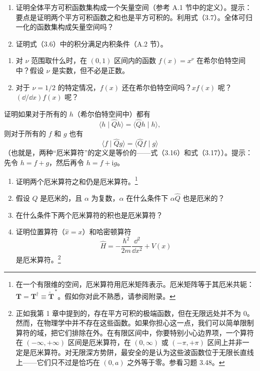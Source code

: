 
\begin{enumerate}
\item 证明全体平方可积函数集构成一个矢量空间（参考 A.1 节中的定义）。提示：要点是证明两个平方可积函数之和也是平方可积的。利用式（3.7）。全体可归一化的函数集构成矢量空间吗？
\item 证明式（3.6）中的积分满足内积条件（A.2 节）。
\end{enumerate}
\vfill

\begin{enumerate}
\item 对 $\nu$ 范围取什么时，在 $(0,1)$ 区间内的函数 $f(x)=x^\nu$ 在希尔伯特空间中？假设 $\nu$ 是实数，但不必是正数。
\item 对于 $\nu=1/2$ 的特定情况，$f(x)$ 还在希尔伯特空间吗？$xf(x)$ 呢？$(\dd/\dd x)f(x)$ 呢？
\end{enumerate}
\vfill

证明如果对于所有的 $h$（希尔伯特空间中）都有
\[
\langle h\mid\hat Qh\rangle=\langle\hat Qh\mid h\rangle,
\]
则对于所有的 $f$ 和 $g$ 也有
\[
\langle f\mid\hat Qg\rangle=\langle\hat Qf\mid g\rangle
\]
（也就是，两种“厄米算符”的定义是等价的——式（3.16）和式（3.17））。提示：先令 $h=f+g$，然后再令 $h=f+\mathrm{i}g$。
\vfill

\begin{enumerate}
\item 证明两个厄米算符之和仍是厄米算符。\footnote{在一个有限维的空间，厄米算符用厄米矩阵表示。厄米矩阵等于其厄米共轭：$\boldsymbol T=\boldsymbol T^\dagger\equiv\widetilde{\boldsymbol T}^{\,*}$。假如你对此不熟悉，请参阅附录。}
\item 假设 $\hat Q$ 是厄米的，且 $\alpha$ 为复数，$\alpha$ 在什么条件下 $\alpha\hat Q$ 也是厄米的？
\item 在什么条件下两个厄米算符的积也是厄米算符？
\item 证明位置算符（$\hat x=x$）和哈密顿算符
\[
\hat H=-\frac{\hbar^2}{2m}\frac{\dd^2}{\dd x^2}+V(x)
\]
是厄米算符。\footnote{正如我第 1 章中提到的，存在平方可积的极端函数，但在无限远处并不为 $0$。然而，在物理学中并不存在这些函数。如果你担心这一点，我们可以简单限制算符的域，把它们排除在外。在有限区间中，你要特别小心边界项，一个算符在 $(-\infty,+\infty)$ 区间是厄米算符，在 $(0,\infty)$ 或 $(-\pi,+\pi)$ 区间上并非一定是厄米算符。对无限深方势阱，最安全的是认为这些波函数位于无限长直线上——它们只不过是恰巧在 $(0,a)$ 之外等于零。参看习题 3.48。}
\end{enumerate}
\vfill

